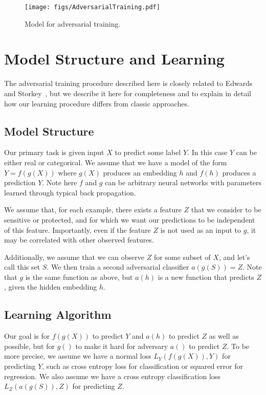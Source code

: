 \documentclass[sigconf,9pt]{acmart}
\begin{document}
\begin{figure}[tb]
    \centering
    \texttt{[image: figs/AdversarialTraining.pdf]}
    \vspace{-12mm}
    \caption{Model for adversarial training.}
    \label{fig:model}
\end{figure}


\section{Model Structure and Learning}
The adversarial training procedure described here is closely related to Edwards and Storkey~\cite{edwards2015censoring}, but we describe it here for completeness and to explain in detail how our learning procedure differs from classic approaches.

\subsection{Model Structure}
Our primary task is given input $X$ to predict some label $Y$.  In this case $Y$ can be either real or categorical.  We assume that we have a model of the form $Y=f(g(X))$ where $g(X)$ produces an embedding $h$ and $f(h)$ produces a prediction $Y$.  Note here $f$ and $g$ can be arbitrary neural networks with parameters learned through typical back propagation.
 
We assume that, for each example, there exists a feature $Z$ that we consider to be sensitive or protected, and for which we want our predictions to be independent of this feature.  Importantly, even if the feature $Z$ is not used as an input to $g$, it may be correlated with other observed features.
 
Additionally, we assume that we can observe $Z$ for some subset of $X$, and let's call this set $S$.  We then train a second adversarial classifier $a(g(S)) = Z$.  Note that $g$ is the same function as above, but $a(h)$ is a new function that predicts $Z$, given the hidden embedding $h$.

\subsection{Learning Algorithm}
Our goal is for $f(g(X))$ to predict $Y$ and $a(h)$ to predict $Z$ as well as possible, but for $g()$ to make it hard for adversary $a()$ to predict $Z$.  To be more precise, we assume we have a normal loss $L_Y(f(g(X)), Y)$ for predicting $Y$, such as cross entropy loss for classification or squared error for regression.  We also assume we have a cross entropy classification loss $L_Z(a(g(S)), Z)$ for predicting $Z$.  
 
\end{document}
